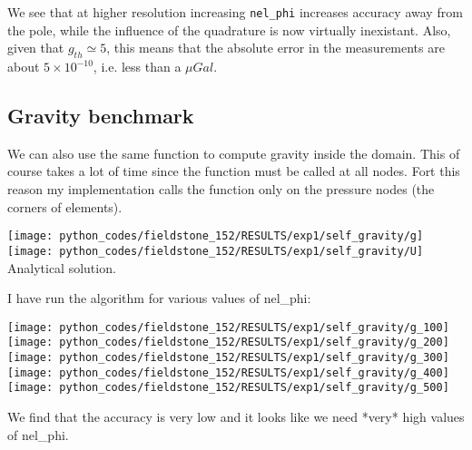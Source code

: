 We see that at higher resolution increasing {\tt nel\_phi} 
increases accuracy away from the pole, while 
the influence of the quadrature is now virtually inexistant.
Also, given that $g_{th}\simeq 5$, this means that the absolute error in the measurements 
are about $5\times 10^{-10}$, i.e. less than a $\mu Gal$.

\newpage
\subsection*{Gravity benchmark}

We can also use the same function to compute gravity inside the domain. 
This of course takes a lot of time since the function must be called at all
nodes. Fort this reason my implementation calls the function only on the pressure
nodes (the corners of elements). 

\begin{center}
\texttt{[image: python\_codes/fieldstone\_152/RESULTS/exp1/self\_gravity/g]}
\texttt{[image: python\_codes/fieldstone\_152/RESULTS/exp1/self\_gravity/U]}\\
{\captionfont Analytical solution.}
\end{center}

I have run the algorithm for various values of {\python nel\_phi}:

\begin{center}
\texttt{[image: python\_codes/fieldstone\_152/RESULTS/exp1/self\_gravity/g\_100]}
\texttt{[image: python\_codes/fieldstone\_152/RESULTS/exp1/self\_gravity/g\_200]}\\
\texttt{[image: python\_codes/fieldstone\_152/RESULTS/exp1/self\_gravity/g\_300]}
\texttt{[image: python\_codes/fieldstone\_152/RESULTS/exp1/self\_gravity/g\_400]}\\
\texttt{[image: python\_codes/fieldstone\_152/RESULTS/exp1/self\_gravity/g\_500]}
\end{center}

We find that the accuracy is very low and it looks like we need *very* high values of 
{\python nel\_phi}.













\newpage
